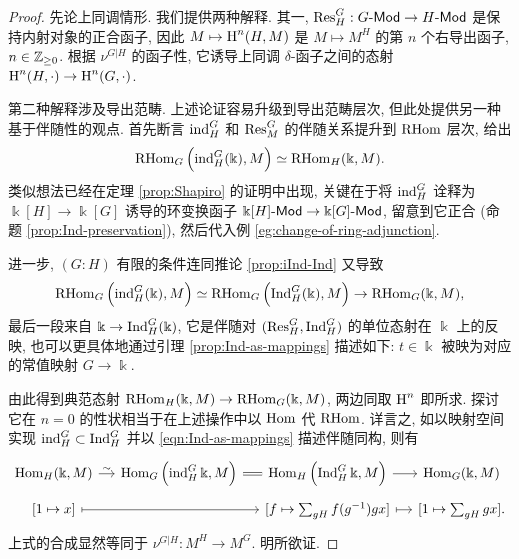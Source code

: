 \begin{proof}
	先论上同调情形. 我们提供两种解释. 其一, $\operatorname{Res}^G_H: G\text{-}\mathsf{Mod} \to H\text{-}\mathsf{Mod}$ 是保持内射对象的正合函子, 因此 $M \mapsto \operatorname{H}^n(H, M)$ 是 $M \mapsto M^H$ 的第 $n$ 个右导出函子, $n \in \mathbb{Z}_{\geq 0}$. 根据 $\nu^{G|H}$ 的函子性, 它诱导上同调 $\delta$-函子之间的态射 $\operatorname{H}^n(H, \cdot) \to \operatorname{H}^n(G, \cdot)$.
	
	第二种解释涉及导出范畴. 上述论证容易升级到导出范畴层次, 但此处提供另一种基于伴随性的观点. 首先断言 $\operatorname{ind}^G_H$ 和 $\operatorname{Res}^G_M$ 的伴随关系提升到 $\operatorname{RHom}$ 层次, 给出
	\[ \operatorname{RHom}_G\left(\operatorname{ind}^G_H(\Bbbk), M\right) \simeq \operatorname{RHom}_H(\Bbbk, M). \]
	类似想法已经在定理 \ref{prop:Shapiro} 的证明中出现, 关键在于将 $\operatorname{ind}^G_H$ 诠释为 $\Bbbk[H] \to \Bbbk[G]$ 诱导的环变换函子 $\Bbbk[H]\text{-}\mathsf{Mod} \to \Bbbk[G]\text{-}\mathsf{Mod}$, 留意到它正合 (命题 \ref{prop:Ind-preservation}), 然后代入例 \ref{eg:change-of-ring-adjunction}.
	
	进一步, $(G:H)$ 有限的条件连同推论 \ref{prop:iInd-Ind} 又导致
	\[ \operatorname{RHom}_G\left(\operatorname{ind}^G_H(\Bbbk), M\right) \simeq \operatorname{RHom}_G\left( \operatorname{Ind}^G_H(\Bbbk), M \right) \to \operatorname{RHom}_G(\Bbbk, M), \]
	最后一段来自 $\Bbbk \to \operatorname{Ind}^G_H(\Bbbk)$, 它是伴随对 $(\operatorname{Res}^G_H, \operatorname{Ind}^G_H)$ 的单位态射在 $\Bbbk$ 上的反映, 也可以更具体地通过引理 \ref{prop:Ind-as-mappings} 描述如下: $t \in \Bbbk$ 被映为对应的常值映射 $G \to \Bbbk$.
	
	由此得到典范态射 $\operatorname{RHom}_H(\Bbbk, M) \to \operatorname{RHom}_G(\Bbbk, M)$, 两边同取 $\operatorname{H}^n$ 即所求. 探讨它在 $n=0$ 的性状相当于在上述操作中以 $\operatorname{Hom}$ 代 $\operatorname{RHom}$. 详言之, 如以映射空间实现 $\operatorname{ind}^G_H \subset \operatorname{Ind}^G_H$ 并以 \eqref{eqn:Ind-as-mappings} 描述伴随同构, 则有
	\[\begin{tikzcd}[row sep=tiny, column sep=small]
		\Hom_H(\Bbbk, M) \arrow[r, "\sim"] & \Hom_G\left(\iInd^G_H \Bbbk, M\right) \arrow[equal, r] & \Hom_H\left(\Ind^G_H \Bbbk, M\right) \arrow[r] & \Hom_G(\Bbbk, M) \\
		{[1 \mapsto x]} \arrow[mapsto, rr] & & {[f \mapsto \sum_{gH} f(g^{-1}) gx]} \arrow[mapsto, r] & {[1 \mapsto \sum_{gH} gx]}.
	\end{tikzcd}\]
	上式的合成显然等同于 $\nu^{G|H}: M^H \to M^G$. 明所欲证.
\end{proof}

